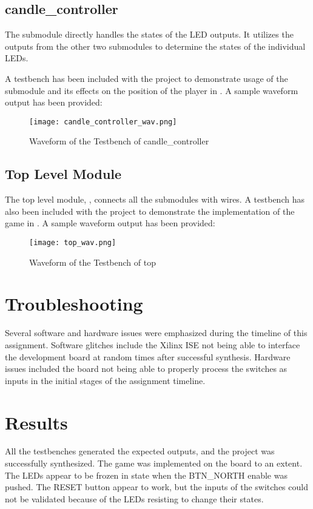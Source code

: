 \documentclass[paper=usletter, fontsize=12pt]{article}
\begin{document}
        \subsection{candle\_controller}

        The  submodule directly handles the states of the LED outputs. It utilizes the outputs from the other two submodules to determine the states of the individual LEDs.

        A testbench has been included with the project to demonstrate usage of the submodule and its effects on the position of the player in . A sample waveform output has been provided:

        \begin{figure}[ht]
            \begin{center}
                \texttt{[image: candle\_controller\_wav.png]}
                \caption{Waveform of the Testbench of candle\_controller} \label{fig:candle_controller_wav}
            \end{center}
        \end{figure}
        \newpage

        \subsection{Top Level Module}
        The top level module, , connects all the submodules with wires. A testbench has also been included with the project to demonstrate the implementation of the game in . A sample waveform output has been provided:

        \begin{figure}[ht]
            \begin{center}
                \texttt{[image: top\_wav.png]}
                \caption{Waveform of the Testbench of top} \label{fig:top_wav}
            \end{center}
        \end{figure}

    \section{Troubleshooting}
    Several software and hardware issues were emphasized during the timeline of this assignment. Software glitches include the Xilinx ISE not being able to interface the development board at random times after successful synthesis. Hardware issues included the board not being able to properly process the switches as inputs in the initial stages of the assignment timeline.

    \section{Results}
    All the testbenches generated the expected outputs, and the project was successfully synthesized. The game was implemented on the board to an extent. The LEDs appear to be frozen in state when the BTN\_NORTH enable was pushed. The RESET button appear to work, but the inputs of the switches could not be validated because of the LEDs resisting to change their states.
\end{document}
